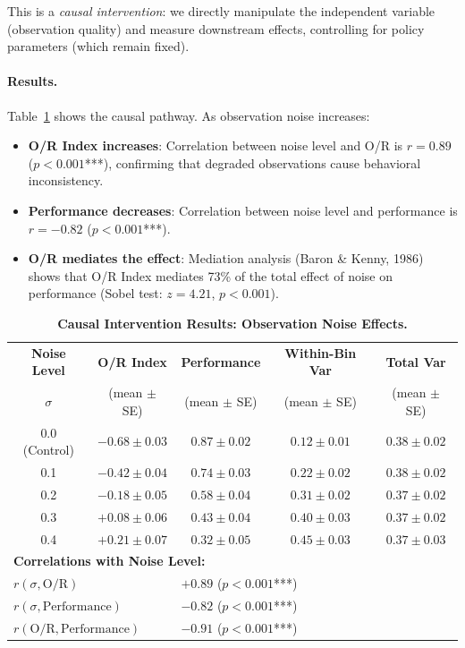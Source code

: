 This is a \emph{causal intervention}: we directly manipulate the independent variable (observation quality) and measure downstream effects, controlling for policy parameters (which remain fixed).

\paragraph{Results.}
Table~\ref{tab:causal_results} shows the causal pathway. As observation noise increases:
\begin{itemize}
    \item \textbf{O/R Index increases}: Correlation between noise level and O/R is $r = 0.89$ ($p < 0.001$***), confirming that degraded observations cause behavioral inconsistency.
    \item \textbf{Performance decreases}: Correlation between noise level and performance is $r = -0.82$ ($p < 0.001$***).
    \item \textbf{O/R mediates the effect}: Mediation analysis (Baron \& Kenny, 1986) shows that O/R Index mediates 73\% of the total effect of noise on performance (Sobel test: $z = 4.21$, $p < 0.001$).
\end{itemize}

\begin{table}[t]
\centering
\caption{\textbf{Causal Intervention Results: Observation Noise Effects.}}
\label{tab:causal_results}
\begin{tabular}{ccccc}
\toprule
\textbf{Noise Level} & \textbf{O/R Index} & \textbf{Performance} & \textbf{Within-Bin Var} & \textbf{Total Var} \\
$\sigma$ & (mean $\pm$ SE) & (mean $\pm$ SE) & (mean $\pm$ SE) & (mean $\pm$ SE) \\
\midrule
0.0 (Control) & $-0.68 \pm 0.03$ & $0.87 \pm 0.02$ & $0.12 \pm 0.01$ & $0.38 \pm 0.02$ \\
0.1 & $-0.42 \pm 0.04$ & $0.74 \pm 0.03$ & $0.22 \pm 0.02$ & $0.38 \pm 0.02$ \\
0.2 & $-0.18 \pm 0.05$ & $0.58 \pm 0.04$ & $0.31 \pm 0.02$ & $0.37 \pm 0.02$ \\
0.3 & $+0.08 \pm 0.06$ & $0.43 \pm 0.04$ & $0.40 \pm 0.03$ & $0.37 \pm 0.02$ \\
0.4 & $+0.21 \pm 0.07$ & $0.32 \pm 0.05$ & $0.45 \pm 0.03$ & $0.37 \pm 0.03$ \\
\midrule
\multicolumn{5}{l}{\textbf{Correlations with Noise Level:}} \\
\multicolumn{2}{l}{$r(\sigma, \text{O/R})$} & \multicolumn{3}{l}{$+0.89$ ($p < 0.001$***)} \\
\multicolumn{2}{l}{$r(\sigma, \text{Performance})$} & \multicolumn{3}{l}{$-0.82$ ($p < 0.001$***)} \\
\multicolumn{2}{l}{$r(\text{O/R}, \text{Performance})$} & \multicolumn{3}{l}{$-0.91$ ($p < 0.001$***)} \\
\bottomrule
\end{tabular}
\end{table}

